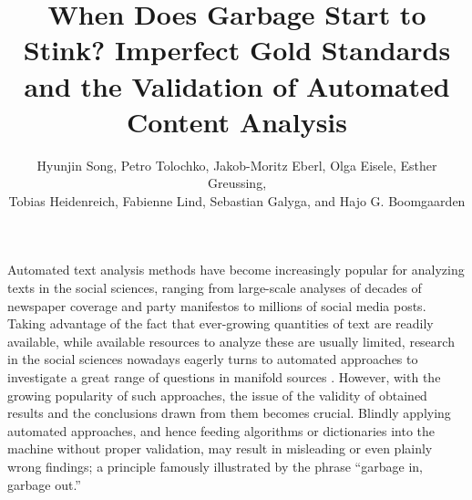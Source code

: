 \documentclass[man, floatsintext, 12pt, a4paper, noextraspace]{apa6}
\title{When Does Garbage Start to Stink? Imperfect Gold Standards and the Validation of Automated Content Analysis}
\author{\addvspace{.25in} Hyunjin Song, Petro Tolochko, Jakob-Moritz Eberl, Olga Eisele, Esther Greussing, \\ Tobias Heidenreich, Fabienne Lind, Sebastian Galyga, and Hajo G. Boomgaarden}
\affiliation{Department of Communication, University of Vienna, Austria}
\begin{document}
\setcounter{page}{0}
\maketitle
    Automated text analysis methods have become increasingly popular for analyzing texts in the social sciences, ranging from large-scale analyses of decades of newspaper coverage and party manifestos to millions of social media posts. Taking advantage of the fact that ever-growing quantities of text are readily available, while available resources to analyze these are usually limited, research in the social sciences nowadays eagerly turns to automated approaches to investigate a great range of questions in manifold sources \parencite{Boumans_Trilling_2016, grimmer2013text}. However, with the growing popularity of such approaches, the issue of the validity of obtained results and the conclusions drawn from them becomes crucial. Blindly applying automated approaches, and hence feeding algorithms or dictionaries into the machine without proper validation, may result in misleading or even plainly wrong findings; a principle famously illustrated by the phrase \enquote{garbage in, garbage out.} 
    
\end{document}
